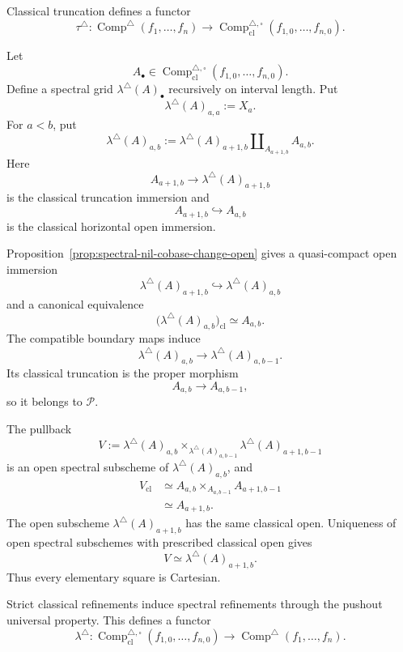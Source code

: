 \begin{construction}
\label{constr:finite-grid-lifting}
Classical truncation defines a functor
\[
    \tau^\triangle:
    \operatorname{Comp}^{\triangle}(f_1,\ldots,f_n)
    \longrightarrow
    \operatorname{Comp}^{\triangle,\square}_{\mathrm{cl}}
    (f_{1,0},\ldots,f_{n,0}).
\]

Let
\[
    A_\bullet
    \in
    \operatorname{Comp}^{\triangle,\square}_{\mathrm{cl}}
    (f_{1,0},\ldots,f_{n,0}).
\]
Define a spectral grid \(\lambda^\triangle(A)_\bullet\) recursively on
interval length.  Put
\[
    \lambda^\triangle(A)_{a,a}
    :=
    X_a.
\]
For \(a<b\), put
\[
    \lambda^\triangle(A)_{a,b}
    :=
    \lambda^\triangle(A)_{a+1,b}
    \amalg_{A_{a+1,b}}
    A_{a,b}.
\]
Here
\[
    A_{a+1,b}
    \longrightarrow
    \lambda^\triangle(A)_{a+1,b}
\]
is the classical truncation immersion and
\[
    A_{a+1,b}
    \hookrightarrow
    A_{a,b}
\]
is the classical horizontal open immersion.

Proposition~\ref{prop:spectral-nil-cobase-change-open} gives a
quasi-compact open immersion
\[
    \lambda^\triangle(A)_{a+1,b}
    \hookrightarrow
    \lambda^\triangle(A)_{a,b}
\]
and a canonical equivalence
\[
    \bigl(
      \lambda^\triangle(A)_{a,b}
    \bigr)_{\mathrm{cl}}
    \simeq
    A_{a,b}.
\]
The compatible boundary maps induce
\[
    \lambda^\triangle(A)_{a,b}
    \longrightarrow
    \lambda^\triangle(A)_{a,b-1}.
\]
Its classical truncation is the proper morphism
\[
    A_{a,b}
    \longrightarrow
    A_{a,b-1},
\]
so it belongs to \(\mathcal P\).

The pullback
\[
    V
    :=
    \lambda^\triangle(A)_{a,b}
    \times_{\lambda^\triangle(A)_{a,b-1}}
    \lambda^\triangle(A)_{a+1,b-1}
\]
is an open spectral subscheme of \(\lambda^\triangle(A)_{a,b}\), and
\[
\begin{aligned}
    V_{\mathrm{cl}}
    &\simeq
    A_{a,b}
    \times_{A_{a,b-1}}
    A_{a+1,b-1} \\
    &\simeq
    A_{a+1,b}.
\end{aligned}
\]
The open subscheme \(\lambda^\triangle(A)_{a+1,b}\) has the same
classical open.  Uniqueness of open spectral subschemes with prescribed
classical open gives
\[
    V
    \simeq
    \lambda^\triangle(A)_{a+1,b}.
\]
Thus every elementary square is Cartesian.

Strict classical refinements induce spectral refinements through the pushout
universal property.  This defines a functor
\[
    \lambda^\triangle:
    \operatorname{Comp}^{\triangle,\square}_{\mathrm{cl}}
    (f_{1,0},\ldots,f_{n,0})
    \longrightarrow
    \operatorname{Comp}^{\triangle}(f_1,\ldots,f_n).
\]
\end{construction}

